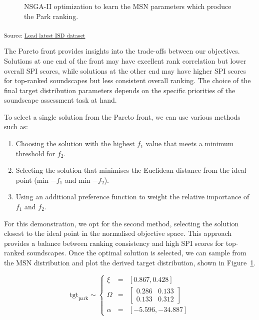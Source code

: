 \documentclass[
  authoryear,
  preprint,
  3p]{elsarticle}
\providecommand{\tightlist}{%
  \setlength{\itemsep}{0pt}\setlength{\parskip}{0pt}}\usepackage{longtable,booktabs,array}
\begin{document}
\begin{figure}
\begin{minipage}{0.50\linewidth}
{}


\end{minipage}%

\caption{\label{fig-pymoo-parks}NSGA-II optimization to learn the MSN
parameters which produce the Park ranking.}

\end{figure}%

\textsubscript{Source:
\href{https://MitchellAcoustics.github.io/J2401_JASA_SSID-Single-Index/notebooks/TargetOptimization.ipynb.html\#cell-fig-pymoo-parks}{Load
latest ISD dataset}}

The Pareto front provides insights into the trade-offs between our
objectives. Solutions at one end of the front may have excellent rank
correlation but lower overall SPI scores, while solutions at the other
end may have higher SPI scores for top-ranked soundscapes but less
consistent overall ranking. The choice of the final target distribution
parameters depends on the specific priorities of the soundscape
assessment task at hand.

To select a single solution from the Pareto front, we can use various
methods such as:

\begin{enumerate}
\def\labelenumi{\arabic{enumi}.}
\tightlist
\item
  Choosing the solution with the highest \(f_1\) value that meets a
  minimum threshold for \(f_2\).
\item
  Selecting the solution that minimises the Euclidean distance from the
  ideal point (min \(-f_1\) and min \(-f_2\)).
\item
  Using an additional preference function to weight the relative
  importance of \(f_1\) and \(f_2\).
\end{enumerate}

For this demonstration, we opt for the second method, selecting the
solution closest to the ideal point in the normalised objective space.
This approach provides a balance between ranking consistency and high
SPI scores for top-ranked soundscapes. Once the optimal solution is
selected, we can sample from the MSN distribution and plot the derived
target distribution, shown in Figure~\ref{fig-pymoo-parks}.

\[
  \text{tgt}_{\text{park}} \sim  \left\{\begin{matrix}
    \xi&=&[0.867, 0.428] \\
    \Omega&=&\begin{bmatrix}
        0.286 & 0.133 \\
        0.133 & 0.312
    \end{bmatrix} \\
    \alpha&=&[-5.596, -34.887]
\end{matrix}\right.
\]
\end{document}
